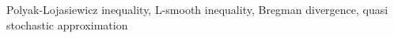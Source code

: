 Polyak-Lojasiewicz inequality, L-smooth inequality, Bregman divergence, quasi stochastic approximation